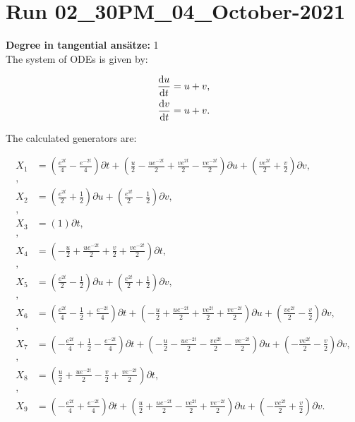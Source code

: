 \section*{Run 02\_30PM\_04\_October-2021}
\textbf{Degree in tangential ansätze:}	1\\
The system of ODEs is given by:

\begin{align*}
\dv{u}{t}&=u + v,\\
\dv{v}{t}&=u + v.\\
\end{align*}

\noindent The calculated generators are:

\begin{align*}
X_{1}&=\left( \frac{e^{2 t}}{4} - \frac{e^{- 2 t}}{4} \right)\partial t+\left( \frac{u}{2} - \frac{u e^{- 2 t}}{2} + \frac{v e^{2 t}}{2} - \frac{v e^{- 2 t}}{2} \right)\partial u+\left( \frac{v e^{2 t}}{2} + \frac{v}{2} \right)\partial v,\\
,\\
X_{2}&=\left( \frac{e^{2 t}}{2} + \frac{1}{2} \right)\partial u+\left( \frac{e^{2 t}}{2} - \frac{1}{2} \right)\partial v,\\
,\\
X_{3}&=\left( 1 \right)\partial t,\\
,\\
X_{4}&=\left( - \frac{u}{2} + \frac{u e^{- 2 t}}{2} + \frac{v}{2} + \frac{v e^{- 2 t}}{2} \right)\partial t,\\
,\\
X_{5}&=\left( \frac{e^{2 t}}{2} - \frac{1}{2} \right)\partial u+\left( \frac{e^{2 t}}{2} + \frac{1}{2} \right)\partial v,\\
,\\
X_{6}&=\left( \frac{e^{2 t}}{4} - \frac{1}{2} + \frac{e^{- 2 t}}{4} \right)\partial t+\left( - \frac{u}{2} + \frac{u e^{- 2 t}}{2} + \frac{v e^{2 t}}{2} + \frac{v e^{- 2 t}}{2} \right)\partial u+\left( \frac{v e^{2 t}}{2} - \frac{v}{2} \right)\partial v,\\
,\\
X_{7}&=\left( - \frac{e^{2 t}}{4} + \frac{1}{2} - \frac{e^{- 2 t}}{4} \right)\partial t+\left( - \frac{u}{2} - \frac{u e^{- 2 t}}{2} - \frac{v e^{2 t}}{2} - \frac{v e^{- 2 t}}{2} \right)\partial u+\left( - \frac{v e^{2 t}}{2} - \frac{v}{2} \right)\partial v,\\
,\\
X_{8}&=\left( \frac{u}{2} + \frac{u e^{- 2 t}}{2} - \frac{v}{2} + \frac{v e^{- 2 t}}{2} \right)\partial t,\\
,\\
X_{9}&=\left( - \frac{e^{2 t}}{4} + \frac{e^{- 2 t}}{4} \right)\partial t+\left( \frac{u}{2} + \frac{u e^{- 2 t}}{2} - \frac{v e^{2 t}}{2} + \frac{v e^{- 2 t}}{2} \right)\partial u+\left( - \frac{v e^{2 t}}{2} + \frac{v}{2} \right)\partial v.\\
\end{align*}
